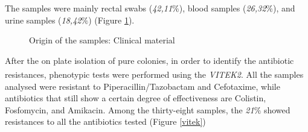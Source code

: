 \documentclass[11pt]{report}
\begin{document}
The samples were mainly rectal swabs (\emph{42,11$\%$}), blood samples (\emph{26,32$\%$}), and urine samples (\emph{18,42$\%$}) (Figure \ref{clinical_mat}).

\begin{figure}[h!]
\centering
{}
\caption{Origin of the samples: Clinical material}
\label{clinical_mat}
\end{figure}

\clearpage

After the on plate isolation of pure colonies, in order to identify the antibiotic resistances, phenotypic tests were performed using the \emph{VITEK}\textsuperscript{\textregistered}\emph{2}.
All the samples analysed were resistant to Piperacillin/Tazobactam and Cefotaxime, while antibiotics that still show a certain degree of effectiveness are Colistin, Fosfomycin, and Amikacin.
Among the thirty-eight samples, the \emph{21$\%$} showed resistances to all the antibiotics tested (Figure \ref{vitek})
\end{document}
